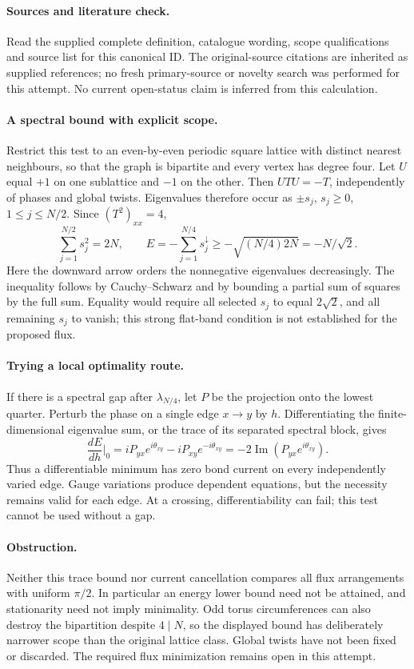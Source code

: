 \documentclass[11pt]{article}
\begin{document}
\paragraph{Sources and literature check.}
Read the supplied complete definition, catalogue wording, scope qualifications and source list for this canonical ID. The original-source citations are inherited as supplied references; no fresh primary-source or novelty search was performed for this attempt. No current open-status claim is inferred from this calculation.

\paragraph{A spectral bound with explicit scope.}Restrict this test to an even-by-even periodic square lattice with distinct nearest neighbours, so that the graph is bipartite and every vertex has degree four. Let \(U\) equal \(+1\) on one sublattice and \(-1\) on the other. Then \(UTU=-T\), independently of phases and global twists. Eigenvalues therefore occur as \(\pm s_j\), \(s_j\ge0\), \(1\le j\le N/2\). Since \((T^2)_{xx}=4\),
\[\sum_{j=1}^{N/2}s_j^2=2N,\qquad
E=-\sum_{j=1}^{N/4}s_j^{\downarrow}\ge-\sqrt{(N/4)2N}=-N/\sqrt2 .\]
Here the downward arrow orders the nonnegative eigenvalues decreasingly. The inequality follows by Cauchy--Schwarz and by bounding a partial sum of squares by the full sum. Equality would require all selected \(s_j\) to equal \(2\sqrt2\), and all remaining \(s_j\) to vanish; this strong flat-band condition is not established for the proposed flux.
\paragraph{Trying a local optimality route.}If there is a spectral gap after \(\lambda_{N/4}\), let \(P\) be the projection onto the lowest quarter. Perturb the phase on a single edge \(x\to y\) by \(h\). Differentiating the finite-dimensional eigenvalue sum, or the trace of its separated spectral block, gives
\[\frac{dE}{dh}\bigg|_{0}=iP_{yx}e^{i\theta_{xy}}-iP_{xy}e^{-i\theta_{xy}}=-2\operatorname{Im}(P_{yx}e^{i\theta_{xy}}).\]
Thus a differentiable minimum has zero bond current on every independently varied edge. Gauge variations produce dependent equations, but the necessity remains valid for each edge. At a crossing, differentiability can fail; this test cannot be used without a gap.
\paragraph{Obstruction.}Neither this trace bound nor current cancellation compares all flux arrangements with uniform \(\pi/2\). In particular an energy lower bound need not be attained, and stationarity need not imply minimality. Odd torus circumferences can also destroy the bipartition despite \(4\mid N\), so the displayed bound has deliberately narrower scope than the original lattice class. Global twists have not been fixed or discarded. The required flux minimization remains open in this attempt.
\end{document}
